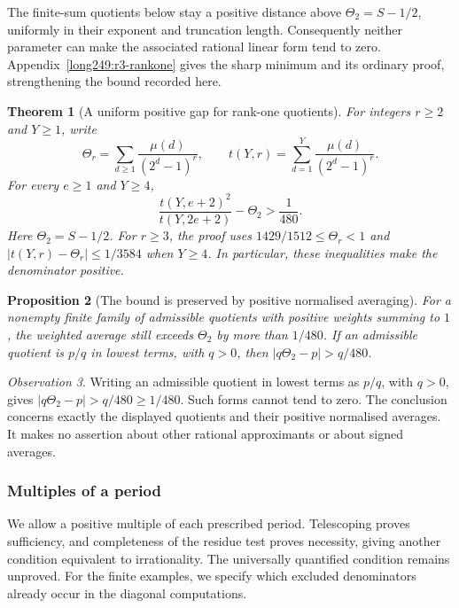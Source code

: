 \documentclass[11pt]{article}
\theoremstyle{plain}
\newtheorem{thm}{Theorem}[section]
\newtheorem{prop}[thm]{Proposition}
\theoremstyle{definition}
\theoremstyle{remark}
\newtheorem{obs}[thm]{Observation}
\begin{document}
The finite-sum quotients below stay a positive distance above
$\Theta_2=S-1/2$, uniformly in their exponent and truncation length.
Consequently neither parameter can make the associated rational
linear form tend to zero. Appendix~\ref{long249:r3-rankone} gives
the sharp minimum and its ordinary proof, strengthening the bound
recorded here.

\begin{thm}[A uniform positive gap for rank-one quotients]\label{thm:uniform-positive-gap-rank-one}
For integers $r\ge2$ and $Y\ge1$, write
\[
 \Theta_r=\sum_{d\ge1}\frac{\mu(d)}{(2^d-1)^r},
 \qquad t(Y,r)=\sum_{d=1}^{Y}\frac{\mu(d)}{(2^d-1)^r}.
\]
For every $e\ge1$ and $Y\ge4$,
\[
 \frac{t(Y,e+2)^2}{t(Y,2e+2)}-\Theta_2>\frac1{480}.
\]
Here $\Theta_2=S-1/2$. For $r\ge3$, the proof uses
$1429/1512\le\Theta_r<1$ and
$|t(Y,r)-\Theta_r|\le1/3584$ when $Y\ge4$.
In particular, these inequalities make the denominator positive.
\end{thm}

\begin{prop}[The bound is preserved by positive normalised averaging]\label{prop:bound-preserved-positive-normalised-averaging}
For a nonempty finite family of admissible quotients with positive
weights summing to $1$, the weighted average still exceeds $\Theta_2$
by more than $1/480$. If an admissible quotient is $p/q$ in lowest terms,
with $q>0$, then $|q\Theta_2-p|>q/480$.
\end{prop}

\begin{obs}
Writing an admissible quotient in lowest terms as $p/q$, with $q>0$,
gives $|q\Theta_2-p|>q/480\ge1/480$. Such forms cannot tend to zero.
The conclusion concerns exactly the displayed quotients and their positive
normalised averages. It makes no assertion about other rational
approximants or about signed averages.
\end{obs}

\subsubsection{Multiples of a period}

We allow a positive multiple of each prescribed period. Telescoping
proves sufficiency, and completeness of the residue test proves
necessity, giving another condition equivalent to irrationality.
The universally quantified condition remains unproved. For the finite
examples, we specify which excluded denominators already occur in the
diagonal computations.
\end{document}
